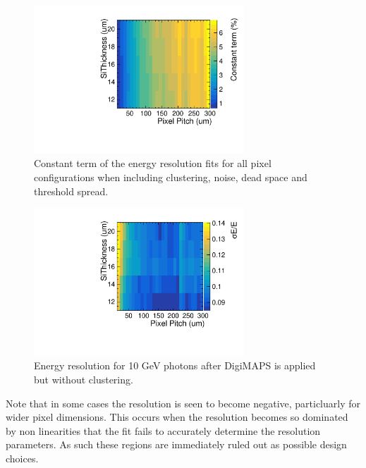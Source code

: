 \begin{figure}
  \centering
  \includegraphics[width=0.7\textwidth,keepaspectratio]{DECALStudies/fig/FullDigiConstant.pdf}
  \caption{Constant term of the energy resolution fits for all pixel configurations when including clustering, noise, dead space and threshold spread. }
  \label{fig:constanttermDigiClust}
\end{figure}

\begin{figure}
  \centering
  \includegraphics[width=0.7\textwidth,keepaspectratio]{DECALStudies/fig/NoClusterRes10.pdf}
  \caption{Energy resolution for 10 GeV photons after DigiMAPS is applied but without clustering.}
  \label{fig:resolution50DigiNoClust}
\end{figure}

Note that in some cases the resolution is seen to become negative, particluarly for wider pixel dimensions. This occurs when the resolution becomes so dominated by non linearities that the fit fails to accurately determine the resolution parameters. As such these regions are immediately ruled out as possible design choices.

